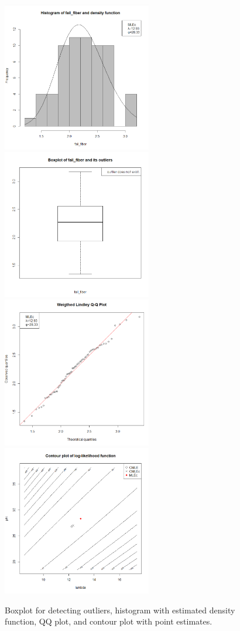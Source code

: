 \begin{figure}[h]%
	\begin{center}
		\includegraphics[width=6.5cm,clip]{hist2.png}
		\includegraphics[width=6.5cm,clip]{boxplot2.png}
		\includegraphics[width=6.5cm,clip]{qq2.png}
		\includegraphics[width=6.5cm,clip]{contour2.png}
		\caption{Boxplot for detecting outliers, histogram with estimated density function, QQ plot, and contour plot with point estimates.}  	\label{fig:histogram}
	\end{center}
\end{figure}

